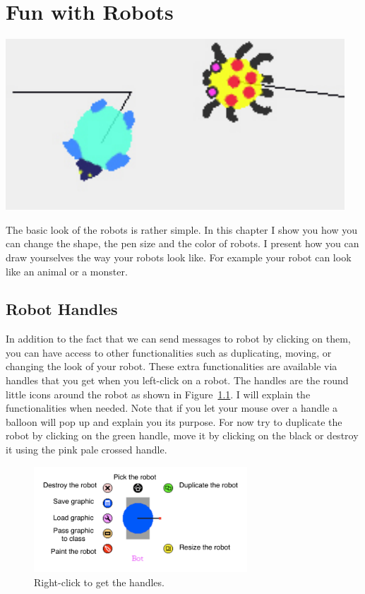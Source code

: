 \ifx\wholebook\relax\else



\fi


\chapter{Fun with Robots}\label{cha:custo}

\begin{chapterfigure}
\includegraphics{beasts}
\end{chapterfigure}

The basic look of the robots is rather simple. In this chapter I show you how you can change the shape, the pen size and the color of robots. I present how you can draw yourselves the way your robots look like. For example your robot can look like an animal or a monster.  



\section{Robot Handles}
In addition to the fact that we can send messages to robot by clicking on them, you can have access to 
other functionalities such as duplicating, moving, or changing the look of your robot. These extra functionalities are available via handles that you get when you left-click on a robot. The handles are the round little icons around the robot as shown in Figure~\ref{fig:allHandles}. I will explain the functionalities when needed. Note that if you let your mouse over a handle a balloon will pop up and explain you its purpose. For now try to duplicate the robot by clicking on the green handle, move it by clicking on the black or destroy it using the pink pale crossed handle. 

\begin{figure}[h]
\begin{center}
\includegraphics[width=8cm]{picaAllHaloAnnotated} 
\end{center}
\caption{Right-click to get the handles. \label{fig:allHandles}}
\end{figure}

